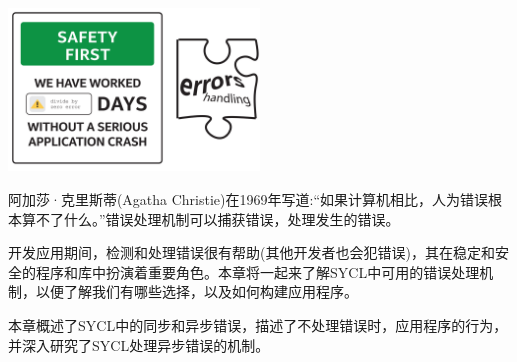 \begin{center}
	\includegraphics[width=0.5\textwidth]{content/chapter-5/images/1}
\end{center}

阿加莎·克里斯蒂(Agatha Christie)在1969年写道:“如果计算机相比，人为错误根本算不了什么。”错误处理机制可以捕获错误，处理发生的错误。\par

开发应用期间，检测和处理错误很有帮助(其他开发者也会犯错误)，其在稳定和安全的程序和库中扮演着重要角色。本章将一起来了解SYCL中可用的错误处理机制，以便了解我们有哪些选择，以及如何构建应用程序。\par

本章概述了SYCL中的同步和异步错误，描述了不处理错误时，应用程序的行为，并深入研究了SYCL处理异步错误的机制。\par